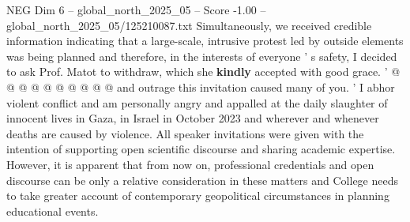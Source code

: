 \begin{textsample}{NEG Dim 6 – global\_north\_2025\_05 – Score -1.00 – global\_north\_2025\_05/125210087.txt}
Simultaneously, we received credible information indicating that a large-scale, intrusive protest led by outside elements was being planned and therefore, in the interests of everyone ' s safety, I decided to ask Prof.
Matot to withdraw, which she \textbf{kindly} accepted with good grace. ' @ @ @ @ @ @ @ @ @ @ and outrage this invitation caused many of you. ' I abhor violent conflict and am personally angry and appalled at the daily slaughter of innocent lives in Gaza, in Israel in October 2023 and wherever and whenever deaths are caused by violence.
All speaker invitations were given with the intention of supporting open scientific discourse and sharing academic expertise.
However, it is apparent that from now on, professional credentials and open discourse can be only a relative consideration in these matters and College needs to take greater account of contemporary geopolitical circumstances in planning educational events.

\end{textsample}
